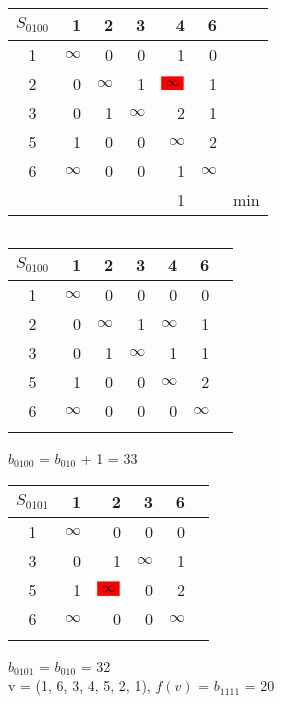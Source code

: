 \documentclass[12pt]{article}
\begin{document}
\begin{flushleft}
 \begin{tabular}{c||rrrrr||c}
$S_{0100}$ & 1 &2 & 3 & 4 & 6 & \\
\hline
\hline
1 & $\infty$ & 0 & 0 & 1  & 0 & \\
2 & 0 & $\infty$ & 1 & $\colorbox{red}{$\infty$}$  & 1 & \\
3 & 0 & 1 & $\infty$ & 2  & 1 & \\
5 & 1 & 0 & 0 & $\infty$  & 2 \\
6 & $\infty$ & 0 & 0 & 1 & $\infty$ & \\
\hline
\hline
 & &   &  & 1 &  &min \\
\end{tabular}
$\qquad $ 
 \begin{tabular}{c||rrrrr||c}
$S_{0100}$ & 1 &2 & 3 & 4 & 6 & \\
\hline
\hline
1 & $\infty$ & 0 & 0 & 0  & 0 & \\
2 & 0 & $\infty$ & 1 & $\infty$  & 1 & \\
3 & 0 & 1 & $\infty$ & 1  & 1 & \\
5 & 1 & 0 & 0 & $\infty$  & 2 \\
6 & $\infty$ & 0 & 0 & 0 & $\infty$ & \\
\hline
\hline
 & &   &  &  &  & \\
\end{tabular}
\end{flushleft}

$b_{0100}$ = $b_{010}$ + 1 = 33\\

\begin{flushleft}
 \begin{tabular}{c||rrrr||c}
$S_{0101}$ & 1 &2 & 3  & 6 & \\
\hline
\hline
1 & $\infty$ & 0 & 0   & 0 & \\
3 & 0 & 1 & $\infty$   & 1 & \\
5 & 1 &  $\colorbox{red}{$\infty$}$ &  0 & 2 &\\
6 & $\infty$ & 0 & 0  & $\infty$ & \\
\hline
\hline
 & &   &  &   & \\
\end{tabular}
\end{flushleft}

$b_{0101}$ = $b_{010}$ = 32\\

v = (1, 6, 3, 4, 5, 2, 1), $f(v)$ = $b_{1111}$  = 20\\
\end{document}
